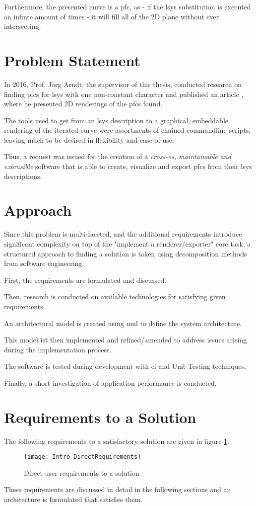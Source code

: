 Furthermore, the presented curve is a \gls{pfc}, as - if the \gls{lsys} substitution is executed an infinte amount of times - it will fill all of the 2D plane without ever intersecting.

\section{Problem Statement}
In 2016, Prof. Jörg Arndt, the supervisor of this thesis, conducted research on finding \gls{pfc}s for \gls{lsys} with one non-constant character and published an article \citep{Arndt2016}, where he presented 2D renderings of the \gls{pfc}s found.

The tools used to get from an \gls{lsys} description to a graphical, embeddable rendering of the iterated curve were assortments of chained commandline scripts, leaving much to be desired in flexibility and ease-of-use.

Thus, a request was issued for the creation of a \emph{cross-\gls{os}, maintainable and extensible} software that is able to create, visualize and export \gls{pfc}s from their \gls{lsys} descriptions.

\section{Approach}

Since this problem is multi-faceted, and the additional requirements introduce significant complexity on top of the "implement a renderer/exporter" core task, a structured approach to finding a solution is taken using decomposition methods from software engineering.

First, the requirements are formulated and discussed.

Then, research is conducted on available technologies for satisfying given requirements.

An architectural model is created using \gls{uml} to define the system architecture.

This model ist then implemented and refined/amended to address issues arising during the implementation process.

The software is tested during development with \gls{ci} and \gls{Unit Testing} techniques.

Finally, a short investigation of application performance is conducted.

\section{Requirements to a Solution}
The following requirements to a satisfactory solution are given in figure \ref{img1}.

\begin{figure}[h]
	\texttt{[image: Intro\_DirectRequirements]}
	\caption{Direct user requirements to a solution}
	\label{img1}
\end{figure}

These requirements are discussed in detail in the following sections and an architecture is formulated that satisfies them.
